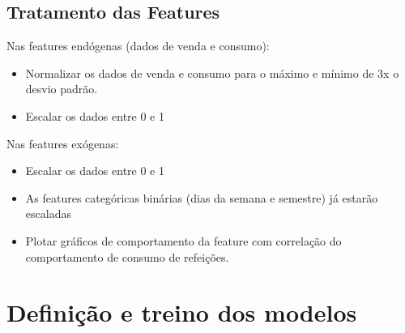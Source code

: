 \documentclass[	12pt, Times, openright, twoside, a4paper, english, brazil]{abntex2}
\begin{document}
            \subsection{Tratamento das Features}
             	Nas features endógenas (dados de venda e consumo):
             	\begin{itemize}
                    \item	Normalizar os dados de venda e consumo para o máximo e mínimo de 3x o desvio padrão. 
                    \item	Escalar os dados entre 0 e 1
                \end{itemize}
                Nas features exógenas:
                \begin{itemize}
                    
                    \item	Escalar os dados entre 0 e 1
                    \item	As features categóricas binárias (dias da semana e semestre) já estarão escaladas
                    \item   Plotar gráficos de comportamento da feature com correlação do comportamento de consumo de refeições.
                \end{itemize}
    \section{Definição e treino dos modelos}
\end{document}
